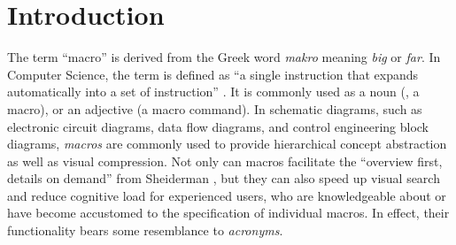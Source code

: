 



 






\section{Introduction}



The term ``macro'' is derived from the Greek word \emph{makro} meaning \emph{big} or \emph{far}.
In Computer Science, the term is defined as ``a single instruction that expands automatically into a set of instruction'' \cite{oxforddict}.
It is commonly used as a noun (\eg, a macro), or an adjective (a macro command). 
In schematic diagrams, such as electronic circuit diagrams, data flow diagrams, and control engineering block diagrams, \emph{macros} are commonly used to provide hierarchical concept abstraction as well as visual compression.
Not only can macros facilitate the ``overview first, details on demand'' from Sheiderman \cite{shneiderman96}, but they can also speed up visual search and reduce cognitive load for experienced users, who are knowledgeable about or have become accustomed to the specification of individual macros.
In effect, their functionality bears some resemblance to \emph{acronyms}.

